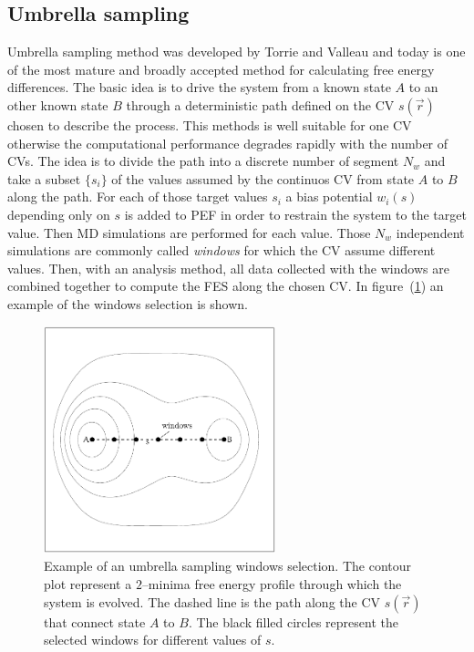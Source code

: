 \subsection{Umbrella sampling}
Umbrella sampling method was developed by Torrie and Valleau and today is one of the most mature and broadly accepted method for calculating free energy differences. The basic idea is to drive the system from a known state $A$ to an other known state $B$ through a deterministic path defined on the \ac{CV} $s(\vec r)$ chosen to describe the process. This methods is well suitable for one \ac{CV} otherwise the computational performance degrades rapidly with the number of \acp{CV}. The idea is to divide the path into a discrete number of segment $N_w$ and take a subset $\{s_i\}$ of the values assumed by the continuos \ac{CV} from state $A$ to $B$ along the path. For each of those target values $s_i$ a bias potential $w_i(s)$ depending only on $s$ is added to \ac{PEF} in order to restrain the system to the target value. Then \ac{MD} simulations are performed for each value. Those $N_w$ independent simulations are commonly called \textit{windows} for which the \ac{CV} assume different values. Then, with an analysis method, all data collected with the windows are combined together to compute the \ac{FES} along the chosen \ac{CV}. In figure~(\ref{fig:umbrellaPath}) an example of the windows selection is shown.
\begin{figure}
	\centering
	\includegraphics[width=0.6\textwidth]{./img/umbrellaPath/umbrellaPath.pdf}
	\caption{Example of an umbrella sampling windows selection. The contour plot represent a $2$--minima free energy profile through which the system is evolved. The dashed line is the path along the \acs{CV} $s(\vec r)$ that connect state $A$ to $B$. The black filled circles represent the selected windows for different values of $s$.}
	\label{fig:umbrellaPath}
\end{figure}

